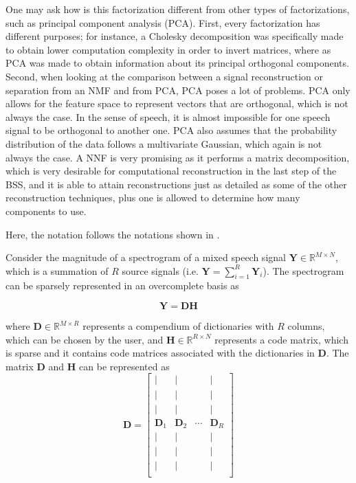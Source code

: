 One may ask how is this factorization different from other types of factorizations, such as principal component analysis (PCA). First, every factorization has different purposes; for instance, a Cholesky decomposition was specifically made to obtain lower computation complexity in order to invert matrices, where as PCA was made to obtain information about its principal orthogonal components. Second, when looking at the comparison between a signal reconstruction or separation from an NMF and from PCA, PCA poses a lot of problems. PCA only allows for the feature space to represent vectors that are orthogonal, which is not always the case. In the sense of speech, it is almost impossible for one speech signal to be orthogonal to another one. PCA also assumes that the probability distribution of the data follows a multivariate Gaussian, which again is not always the case. A NNF is very promising as it performs a matrix decomposition, which is very desirable for computational reconstruction in the last step of the BSS, and it is able to attain reconstructions just as detailed as some of the other reconstruction techniques, plus one is allowed to determine how many components to use.

Here, the notation follows the notations shown in \cite{singlechannel}.

Consider the magnitude of a spectrogram of a mixed speech signal $\bm{Y} \in \mathbb{R}^{M\times N}$, which is a summation of $R$ source signals (i.e. $\bm{Y} = \sum_{i=1}^{R} \bm{Y}_i$). The spectrogram can be sparsely represented in an overcomplete basis as

$$\bm{Y} = \bm{D} \bm{H}$$

where $\bm{D} \in \mathbb{R}^{M \times R}$ represents a compendium of dictionaries with $R$ columns, which can be chosen by the user, and $\bm{H} \in \mathbb{R}^{R \times N}$ represents a code matrix, which is sparse and it contains code matrices associated with the dictionaries in $\bm{D}$. The matrix $\bm{D}$ and $\bm{H}$ can be represented as
\begin{equation*}
    \bm{D} = \begin{bmatrix}
    | & | & & | \\
    | & | & & | \\
    | & | & & | \\
    \bm{D}_1 & \bm{D}_2 & \cdots & \bm{D}_R \\
    | & | & & | \\
    | & | & & | \\
    | & | & & | \\
    \end{bmatrix}
\end{equation*}

